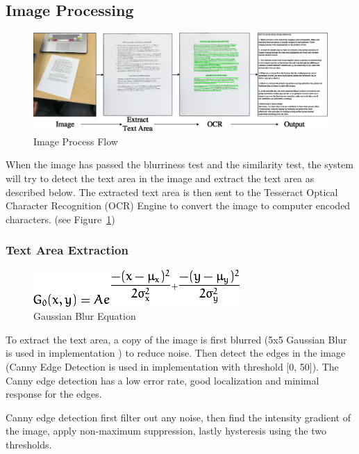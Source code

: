 \subsection{Image Processing}
\begin{figure}
	\centering
    \includegraphics[scale = 0.4]{ImageProcess.png}
    
    \caption{Image Process Flow}
	\label{imageProcessFlow}
\end{figure}
When the image has passed the blurriness test and the similarity test, the system will try to detect the text area in the image and extract the text area as described below. The extracted text area is then sent to the Tesseract Optical Character Recognition (OCR) Engine to convert the image to computer encoded characters. (see Figure~\ref{imageProcessFlow})

\subsubsection{Text Area Extraction}
\begin{figure}
	\centering
    \includegraphics[scale = 1]{gaussianBlur.png}
    
    \caption{Gaussian Blur Equation}
	\label{GaussianBlurEquation}
\end{figure}
To extract the text area, a copy of the image is first blurred (5x5 Gaussian Blur is used in implementation \cite{gaussianBlur}) to reduce noise. Then detect the edges in the image (Canny Edge Detection is used in implementation \cite{canny} with threshold [0, 50]). The Canny edge detection has a low error rate, good localization and minimal response for the edges.

	Canny edge detection first filter out any noise, then find the intensity gradient of the image, apply non-maximum suppression, lastly hysteresis using the two thresholds.
	
